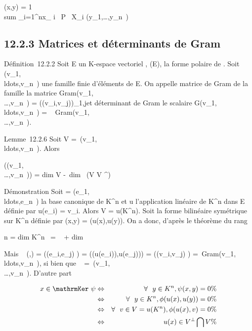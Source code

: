 \documentclass[]{article}
\begin{document}
\phi(x,y) = 1  \\sum
_i=1^nx_ i \partial~P \over
\partial~X_i
(y_1,\ldots,y_n~)

\subsection{12.2.3 Matrices et déterminants de Gram}

Définition~12.2.2 Soit E un K-espace vectoriel , \Phi \inQ(E), \phi la forme
polaire de \Phi. Soit
(v_1,\\ldots,v_n~)
une famille finie d'éléments de E. On appelle matrice de Gram de la
famille la matrice
Gram(v_1,\\\ldots,v_n~)
= (\phi(v_i,v_j))_1\leqi,j\leqn et déterminant de Gram
le scalaire
G(v_1,\\ldots,v_n~)
= ~
Gram(v_1,\\\ldots,v_n~).

Lemme~12.2.6 Soit V =\
\mathrmVect(v_1,\\ldots,v_n~).
Alors

\mathrmrg(\Gram(v_1,\\\ldots,v_n~))
= dim V -\ dim~ (V \bigcap
V ^\bot)

Démonstration Soit  =
(e_1,\\ldots,e_n~)
la base canonique de K^n et u l'application linéaire de
K^n dans E définie par u(e_i) = v_i. Alors
V = u(K^n). Soit \psi la forme bilinéaire symétrique sur
K^n définie par \psi(x,y) = \phi(u(x),u(y)). On a donc, d'après le
théorème du rang

n = dim K^n~
= \mathrmrg~\psi
+ dim~
\mathrmKer~\psi

Mais \mathrmMat~ (\psi,) =
\left (\psi(e_i,e_j)\right
) = \left
(\phi(u(e_i)),u(e_j))\right ) =
\left (\phi(v_i,v_j)\right
) =\
Gram(v_1,\\ldots,v_n~),
si bien que \mathrmrg~\psi
=\
\mathrmrgGram(v_1,\\\ldots,v_n~).
D'autre part

\begin{align*} x
\in\mathrmKer~\psi&
\Leftrightarrow & \forall~~y \in
K^n, \psi(x,y) = 0 \%& \\ &
\Leftrightarrow & \forall~~y \in
K^n,\phi(u(x),u(y)) = 0 \%& \\ &
\Leftrightarrow & \forall~~v \in V =
u(K^n), \phi(u(x),v) = 0\%& \\ &
\Leftrightarrow & u(x) \in V ^\bot\bigcap V \%&
\\ \end{align*}
\end{document}
